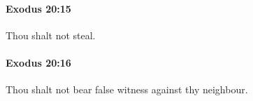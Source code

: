 		\paragraph{Exodus 20:15} %
			\label{EXODUS-20-15}

			Thou shalt not steal.


		\paragraph{Exodus 20:16} %
			\label{EXODUS-20-16}

			Thou shalt not bear false witness against thy neighbour.


